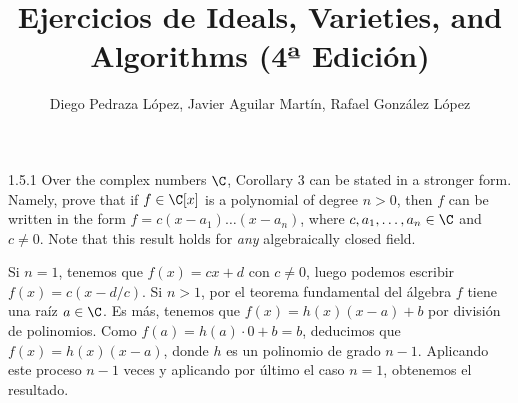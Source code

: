 \documentclass[twoside]{article}
\begin{document}
\title{Ejercicios de Ideals, Varieties, and Algorithms (4ª Edición)}
\author{Diego Pedraza López, Javier Aguilar Martín, Rafael González López}
\maketitle

\begin{ejercicio}{1.5.1}
Over the complex numbers $\C$, Corollary 3 can be stated in a stronger form. Namely, prove that if $f \in \C[x]$ is a polynomial of degree $n > 0$, then $f$ can be written in the form $f = c(x-a_1)\dots(x-a_n)$, where $c,a_1,\dots,a_n \in \C$ and $c \neq 0$.
Note that this result  holds for \emph{any} algebraically closed field.
\end{ejercicio}
\begin{solucion}
Si $n = 1$, tenemos que $f(x) = cx+d$ con $c \neq 0$, luego podemos escribir $f(x) = c(x-d/c)$.
Si $n > 1$, por el teorema fundamental del álgebra $f$ tiene una raíz $a \in \C$.
Es más, tenemos que $f(x) = h(x)(x-a)+b$ por división de polinomios.
Como $f(a) = h(a)\cdot 0 + b = b$, deducimos que $f(x) = h(x)(x-a)$, donde $h$ es un polinomio de grado $n-1$.
Aplicando este proceso $n-1$ veces y aplicando por último el caso $n=1$, obtenemos el resultado.
\end{solucion}

\newpage
\end{document}
